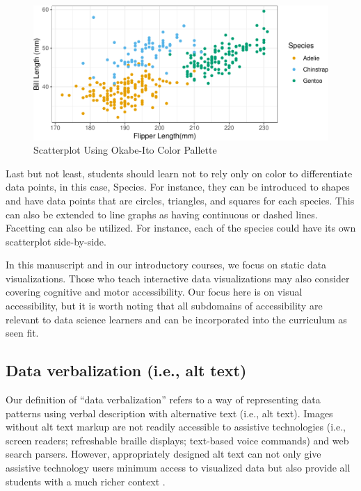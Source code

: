 \documentclass[12pt]{article}
\begin{document}
\begin{figure}
\includegraphics{figure/penguins-okabe-1} \caption{Scatterplot Using Okabe-Ito Color Pallette}\label{fig:penguins-okabe}
\end{figure}

Last but not least, students should learn not to rely only on color to differentiate data points, in this case, Species.
For instance, they can be introduced to shapes and have data points that are circles, triangles, and squares for each species.
This can also be extended to line graphs as having continuous or dashed lines.
Facetting can also be utilized.
For instance, each of the species could have its own scatterplot side-by-side.

In this manuscript and in our introductory courses, we focus on static data visualizations.
Those who teach interactive data visualizations may also consider covering cognitive and motor accessibility.
Our focus here is on visual accessibility, but it is worth noting that all subdomains of accessibility are relevant to data science learners and can be incorporated into the curriculum as seen fit.

\hypertarget{data-verbalization-i.e.-alt-text}{%
\subsection{Data verbalization (i.e., alt text)}\label{data-verbalization-i.e.-alt-text}}

Our definition of ``data verbalization'' refers to a way of representing data patterns using verbal description with alternative text (i.e., alt text).
Images without alt text markup are not readily accessible to assistive technologies (i.e., screen readers; refreshable braille displays; text-based voice commands) and web search parsers.
However, appropriately designed alt text can not only give assistive technology users minimum access to visualized data but also provide all students with a much richer context \citep{lundgardAccessibleVisualizationNatural2022}.
\end{document}
